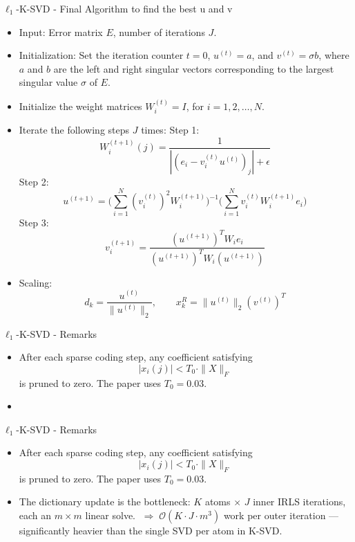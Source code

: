 \documentclass{beamer}
\begin{document}
\begin{frame}{$\ell_1$-K-SVD - Final Algorithm to find the best u and v}
\scriptsize
\begin{itemize}
    \item Input: Error matrix $E$, number of iterations $J$.
    \item Initialization:
    Set the iteration counter $t=0$, $u^{(t)}=a$, and
    $v^{(t)}=\sigma b$, where $a$ and $b$ are the left and right singular
    vectors corresponding to the largest singular value $\sigma$ of $E$.
    \item Initialize the weight matrices $W_i^{(t)}=I$, for $i=1,2,\ldots,N$.
    \item Iterate the following steps $J$ times:
    Step 1:
    \[
    W_i^{(t+1)}(j)=\frac{1}{|(e_i-v_i^{(t)}u^{(t)})_j|+\epsilon}
    \]
    Step 2:
    \[
    u^{(t+1)}=
    \Big(\sum_{i=1}^{N} (v_i^{(t)})^2 W_i^{(t+1)}\Big)^{-1}
    \Big(\sum_{i=1}^{N} v_i^{(t)} W_i^{(t+1)} e_i\Big)
    \]
    Step 3:
    \[
    v_i^{(t+1)}=
    \frac{(u^{(t+1)})^T W_i e_i}
    {(u^{(t+1)})^T W_i (u^{(t+1)})}
    \]
    \item Scaling:
    \[
    d_k=\frac{u^{(t)}}{\|u^{(t)}\|_2},
    \qquad
    x_k^R=\|u^{(t)}\|_2 (v^{(t)})^T
    \]
\end{itemize}
\end{frame}


 
\begin{frame}{$\ell_1$-K-SVD - Remarks}
\begin{itemize}
    \item After each sparse coding step, any coefficient satisfying
    \[
    |x_i(j)| < T_0 \cdot \|X\|_F
    \]
    is pruned to zero. The paper uses $T_0 = 0.03$.
    \item[] 
\end{itemize}
\end{frame}

\begin{frame}{$\ell_1$-K-SVD - Remarks}
\begin{itemize}
    \item After each sparse coding step, any coefficient satisfying
    \[
    |x_i(j)| < T_0 \cdot \|X\|_F
    \]
    is pruned to zero. The paper uses $T_0 = 0.03$.
    \item The dictionary update is the bottleneck:
    $K$ atoms $\times$ $J$ inner IRLS iterations, each an $m\times m$ linear solve.
    $\;\Rightarrow\;\mathcal{O}(K\cdot J\cdot m^3)$ work per outer iteration —
    significantly heavier than the single SVD per atom in K-SVD.
\end{itemize}
\end{frame}
\end{document}
